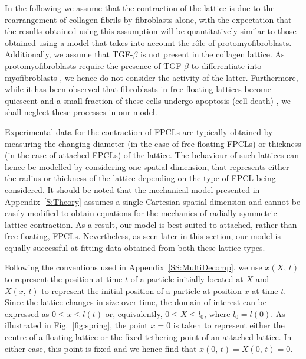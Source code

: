 In the following we assume that the contraction of the lattice is due to the rearrangement of collagen fibrils by fibroblasts alone, with the expectation that the results obtained using this assumption will be quantitatively similar to those obtained using a model that takes into account the r\^{o}le of protomyofibroblasts. Additionally, we assume that TGF-$\beta$ is not present in the collagen lattice. As protomyofibroblasts require the presence of TGF-$\beta$ to differentiate into myofibroblasts \citep{Tomasek2002}, we hence do not consider the activity of the latter. Furthermore, while it has been observed that fibroblasts in free-floating lattices become quiescent \citep{Rosenfeldt2000} and a small fraction of these cells undergo apoptosis (cell death) \citep{Fluck1998,Grinnell1999}, we shall neglect these processes in our model.

Experimental data for the contraction of FPCLs are typically obtained by measuring the changing diameter (in the case of free-floating FPCLs) or thickness (in the case of attached FPCLs) of the lattice. The behaviour of such lattices can hence be modelled by considering one spatial dimension, that represents either the radius or thickness of the lattice depending on the type of FPCL being considered. It should be noted that the mechanical model presented in Appendix~\ref{S:Theory} assumes a single Cartesian spatial dimension and cannot be easily modified to obtain equations for the mechanics of radially symmetric lattice contraction. As a result, our model is best suited to attached, rather than free-floating, FPCLs. Nevertheless, as seen later in this section, our model is equally successful at fitting data obtained from both these lattice types.

Following the conventions used in Appendix~\ref{SS:MultiDecomp}, we use $x(X,\,t)$ to represent the position at time $t$ of a particle initially located at $X$ and $X(x,\,t)$ to represent the initial position of a particle at position $x$ at time $t$. Since the lattice changes in size over time, the domain of interest can be expressed as $0 \leq x \leq l(t)$ or, equivalently, $0 \leq X \leq l_0$, where $l_0 = l(0)$. As illustrated in Fig.~\ref{fig:spring}, the point $x = 0$ is taken to represent either the centre of a floating lattice or the fixed tethering point of an attached lattice. In either case, this point is fixed and we hence find that $x(0,\,t) = X(0,\,t) = 0$.

\begin{figure*}[ht]
\caption{Sketch of the different situations that can be described using our morphoelastic model. Here the dashed lines represent the substrate and the arrows represent the directions of contraction of the collagen lattice (pink). (a) In the case of a free-floating FPCL, we have symmetry about $x=0$. (b) In the case of an attached FPCL, $x=0$ represents the base of the lattice and $x=l(t)$ is the contracting edge. This situation can be thought of as the case of a lattice with a spring of infinite stiffness attached at $x=0$.}
\label{fig:spring}
\end{figure*}


